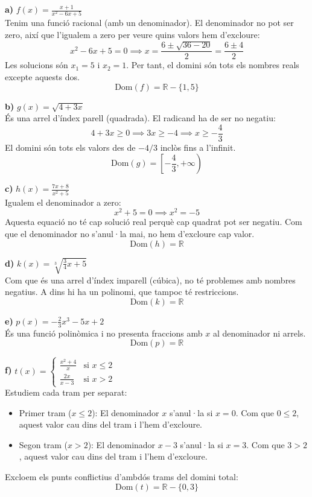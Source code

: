\documentclass[12pt,a4paper]{article}
\begin{document}
\textbf{a)} $f(x) = \frac{x+1}{x^2-6x+5}$ \\
Tenim una funció racional (amb un denominador). El denominador no pot ser zero, així que l'igualem a zero per veure quins valors hem d'excloure:
\[ x^2-6x+5 = 0 \implies x = \frac{6 \pm \sqrt{36 - 20}}{2} = \frac{6 \pm 4}{2} \]
Les solucions són $x_1 = 5$ i $x_2 = 1$.
Per tant, el domini són tots els nombres reals excepte aquests dos.
\[ \text{Dom}(f) = \mathbb{R} - \{1, 5\} \]

\textbf{b)} $g(x) = \sqrt{4+3x}$ \\
És una arrel d'índex parell (quadrada). El radicand ha de ser no negatiu:
\[ 4+3x \ge 0 \implies 3x \ge -4 \implies x \ge -\frac{4}{3} \]
El domini són tots els valors des de $-4/3$ inclòs fins a l'infinit.
\[ \text{Dom}(g) = \left[-\frac{4}{3}, +\infty\right) \]

\textbf{c)} $h(x) = \frac{7x+8}{x^2+5}$ \\
Igualem el denominador a zero:
\[ x^2+5 = 0 \implies x^2 = -5 \]
Aquesta equació no té cap solució real perquè cap quadrat pot ser negatiu. Com que el denominador no s'anul·la mai, no hem d'excloure cap valor.
\[ \text{Dom}(h) = \mathbb{R} \]

\textbf{d)} $k(x) = \sqrt[3]{\frac{3}{4}x+5}$ \\
Com que és una arrel d'índex imparell (cúbica), no té problemes amb nombres negatius. A dins hi ha un polinomi, que tampoc té restriccions.
\[ \text{Dom}(k) = \mathbb{R} \]

\textbf{e)} $p(x) = -\frac{2}{3}x^3 - 5x + 2$ \\
És una funció polinòmica i no presenta fraccions amb $x$ al denominador ni arrels. 
\[ \text{Dom}(p) = \mathbb{R} \]

\textbf{f)} $t(x) = \begin{cases} \frac{x^2+4}{x} & \text{si } x \le 2 \\ \frac{2x}{x-3} & \text{si } x > 2 \end{cases}$ \\
Estudiem cada tram per separat:
\begin{itemize}
    \item Primer tram ($x \le 2$): El denominador $x$ s'anul·la si $x = 0$. Com que $0 \le 2$, aquest valor cau dins del tram i l'hem d'excloure.
    \item Segon tram ($x > 2$): El denominador $x-3$ s'anul·la si $x = 3$. Com que $3 > 2$, aquest valor cau dins del tram i l'hem d'excloure.
\end{itemize}
Excloem els punts conflictius d'ambdós trams del domini total:
\[ \text{Dom}(t) = \mathbb{R} - \{0, 3\} \]
\end{document}
